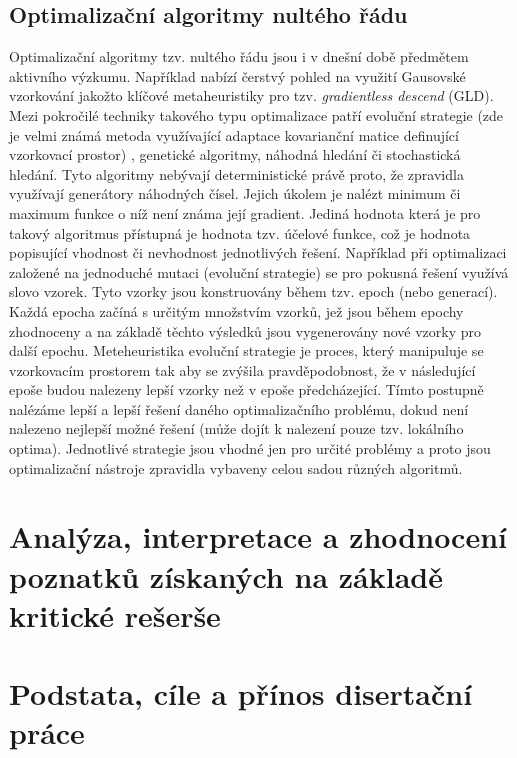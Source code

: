 \section{Optimalizační algoritmy nultého řádu}
\label{sec:opt_alg}
Optimalizační algoritmy tzv. nultého řádu jsou i v dnešní době předmětem
aktivního výzkumu. Například \cite{golovin2019gradientless} nabízí čerstvý
pohled na využití Gausovské vzorkování jakožto klíčové metaheuristiky pro
tzv. \textit{gradientless descend} (GLD). Mezi pokročilé techniky takového
typu optimalizace patří evoluční strategie (zde je velmi známá metoda
využívající adaptace kovarianční matice definující vzorkovací prostor)
, genetické algoritmy, náhodná hledání či stochastická hledání.
Tyto algoritmy nebývají deterministické právě proto, že zpravidla využívají
generátory náhodných čísel. Jejich úkolem je nalézt minimum či maximum funkce o
níž není známa její gradient. Jediná hodnota která je pro takový algoritmus
přístupná je hodnota tzv. účelové funkce, což je hodnota popisující vhodnost či
nevhodnost jednotlivých řešení. Například při optimalizaci založené na
jednoduché mutaci (evoluční strategie) se pro pokusná řešení využívá slovo
vzorek. Tyto vzorky jsou konstruovány během tzv. epoch (nebo generací). Každá
epocha začíná s určitým množstvím vzorků, jež jsou během epochy zhodnoceny a na
základě těchto výsledků jsou vygenerovány nové vzorky pro další epochu.
Meteheuristika evoluční strategie je proces, který manipuluje se vzorkovacím
prostorem tak aby se zvýšila pravděpodobnost, že v následující epoše budou
nalezeny lepší vzorky než v epoše předcházející. Tímto postupně nalézáme lepší
a lepší řešení daného optimalizačního problému, dokud není nalezeno nejlepší
možné řešení (může dojít k nalezení pouze tzv. lokálního optima). Jednotlivé
strategie jsou vhodné jen pro určité problémy a proto jsou optimalizační
nástroje zpravidla vybaveny celou sadou různých algoritmů.

\chapter{Analýza, interpretace a zhodnocení poznatků získaných na základě
kritické rešerše}
\chapter{Podstata, cíle a přínos disertační práce}
\label{chap:Aims_of_disertation}
